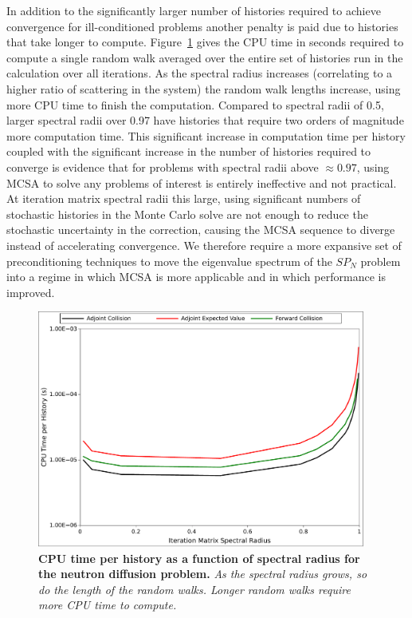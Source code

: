 In addition to the significantly larger number of histories required
to achieve convergence for ill-conditioned problems another penalty is
paid due to histories that take longer to
compute. Figure~\ref{fig:breakdown_time} gives the CPU time in seconds
required to compute a single random walk averaged over the entire set
of histories run in the calculation over all iterations. As the
spectral radius increases (correlating to a higher ratio of scattering
in the system) the random walk lengths increase, using more CPU time
to finish the computation. Compared to spectral radii of 0.5, larger
spectral radii over 0.97 have histories that require two orders of
magnitude more computation time. This significant increase in
computation time per history coupled with the significant increase in
the number of histories required to converge is evidence that for
problems with spectral radii above $\approx 0.97$, using MCSA to solve
any problems of interest is entirely ineffective and not practical. At
iteration matrix spectral radii this large, using significant numbers
of stochastic histories in the Monte Carlo solve are not enough to
reduce the stochastic uncertainty in the correction, causing the MCSA
sequence to diverge instead of accelerating convergence. We therefore
require a more expansive set of preconditioning techniques to move the
eigenvalue spectrum of the $SP_N$ problem into a regime in which MCSA
is more applicable and in which performance is improved.
\begin{figure}[t!]
  \begin{center}
    \includegraphics[width=4.25in]{chapters/spn_equations/breakdown_time.pdf}
  \end{center}
  \caption{\textbf{CPU time per history as a function of spectral
      radius for the neutron diffusion problem.} \textit{As the
      spectral radius grows, so do the length of the random
      walks. Longer random walks require more CPU time to compute.}}
  \label{fig:breakdown_time}
\end{figure}

